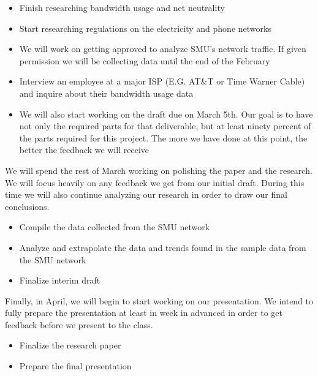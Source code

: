 \documentclass{sigcomm-alternate}
\begin{document}
\begin{itemize}	
	\item Finish researching bandwidth usage and net neutrality

	\item Start researching regulations on the electricity and phone networks

	\item We will work on getting approved to analyze SMU's network traffic. If given permission we will be collecting data until the end of the February
		
	\item Interview an employee at a major ISP (E.G. AT\&T or Time Warner Cable) and inquire about their bandwidth usage data
		
	\item We will also start working on the draft due on March 5th. Our goal is to have not only the required parts for that deliverable, but at least ninety percent of the parts required for this project. The more we have done at this point, the better the feedback we will receive%
		
\end{itemize}



We will spend the rest of March working on polishing the paper and the research. We will focus heavily on any feedback we get from our initial draft. During this time we will also continue analyzing our research in order to draw our final conclusions.
\begin{itemize}
	\item Compile the data collected from the SMU network
	\item Analyze and extrapolate the data and trends found in the sample data from the SMU network
	\item Finalize interim draft
\end{itemize}


Finally, in April, we will begin to start working on our presentation. We intend to fully prepare the presentation at least in week in advanced in order to get feedback before we present to the class. 
\begin{itemize}
		\item Finalize the research paper
		\item Prepare the final presentation
\end{itemize}

		
\end{document}
